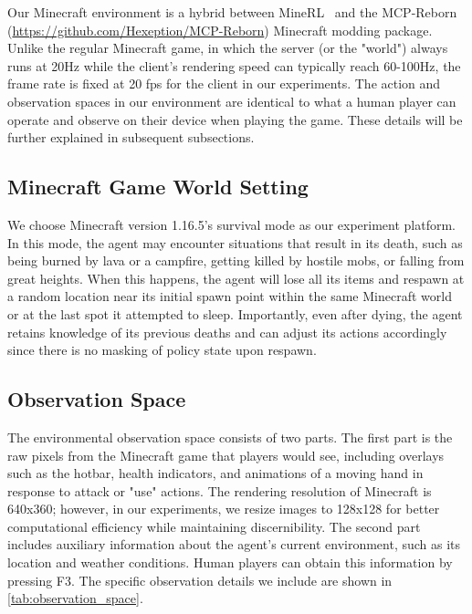 Our Minecraft environment is a hybrid between MineRL~\citep{minerl} and the MCP-Reborn (\href{https://github.com/Hexeption/MCP-Reborn}{https://github.com/Hexeption/MCP-Reborn}) Minecraft modding package. Unlike the regular Minecraft game, in which the server (or the "world") always runs at 20Hz while the client’s rendering speed can typically reach 60-100Hz, the frame rate is fixed at 20 fps for the client in our experiments. The action and
observation spaces in our environment are identical to what a human player can operate and observe on their device when
playing the game. These details will be further explained in subsequent subsections.

\subsection{Minecraft Game World Setting}
We choose Minecraft version 1.16.5’s survival mode as our experiment platform. In this mode, the
agent may encounter situations that result in its death, such as being burned by lava or a campfire, getting killed by hostile
mobs, or falling from great heights. When this happens, the agent will lose all its items and respawn at a random location
near its initial spawn point within the same Minecraft world or at the last spot it attempted to sleep. Importantly, even after
dying, the agent retains knowledge of its previous deaths and can adjust its actions accordingly since there is no masking of
policy state upon respawn.

\subsection{Observation Space}
The environmental observation space consists of two parts. The first part is the raw pixels from the
Minecraft game that players would see, including overlays such as the hotbar, health indicators, and
animations of a moving hand in response to attack or "use" actions. The rendering resolution of Minecraft is 640x360; however, in our experiments, we resize images to 128x128 for better computational efficiency while maintaining discernibility.
The second part includes auxiliary information about the agent’s current environment, such as its location and weather conditions.
Human players can obtain this information by pressing F3. The specific observation details we include
are shown in \cref{tab:observation_space}. 

